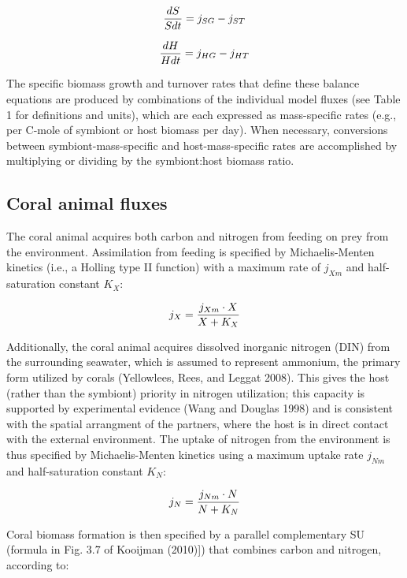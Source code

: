 \documentclass[]{elsarticle} %
\begin{document}
\begin{equation} {dS \over Sdt} = j_{SG} - j_{ST} \end{equation}

\begin{equation} {dH \over Hdt} = j_{HG} - j_{HT} \end{equation}

The specific biomass growth and turnover rates that define these balance
equations are produced by combinations of the individual model fluxes
(see Table 1 for definitions and units), which are each expressed as
mass-specific rates (e.g., per C-mole of symbiont or host biomass per
day). When necessary, conversions between symbiont-mass-specific and
host-mass-specific rates are accomplished by multiplying or dividing by
the symbiont:host biomass ratio.

\subsection{Coral animal fluxes}\label{coral-animal-fluxes}

The coral animal acquires both carbon and nitrogen from feeding on prey
from the environment. Assimilation from feeding is specified by
Michaelis-Menten kinetics (i.e., a Holling type II function) with a
maximum rate of \(j_{Xm}\) and half-saturation constant \(K_X\):

\begin{equation} j_X = {{j_{Xm} \cdot X} \over {X + K_X}} \end{equation}

Additionally, the coral animal acquires dissolved inorganic nitrogen
(DIN) from the surrounding seawater, which is assumed to represent
ammonium, the primary form utilized by corals (Yellowlees, Rees, and
Leggat 2008). This gives the host (rather than the symbiont) priority in
nitrogen utilization; this capacity is supported by experimental
evidence (Wang and Douglas 1998) and is consistent with the spatial
arrangment of the partners, where the host is in direct contact with the
external environment. The uptake of nitrogen from the environment is
thus specified by Michaelis-Menten kinetics using a maximum uptake rate
\(j_{Nm}\) and half-saturation constant \(K_N\):

\begin{equation} j_N = {{j_{Nm} \cdot N} \over {N + K_N}} \end{equation}

Coral biomass formation is then specified by a parallel complementary SU
(formula in Fig. 3.7 of Kooijman (2010){]}) that combines carbon and
nitrogen, according to:
\end{document}
